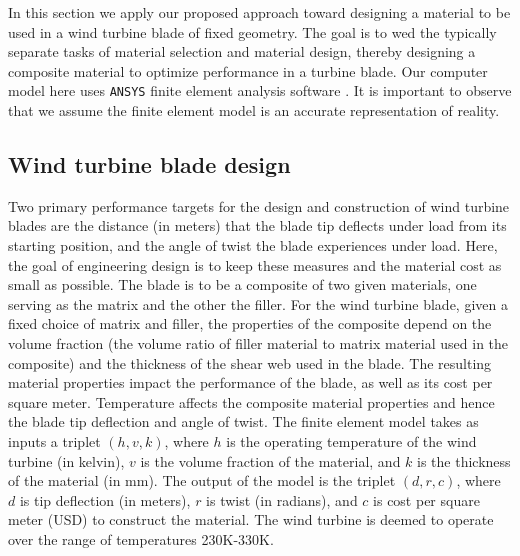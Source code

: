 \documentclass[12pt]{article}
\begin{document}
In this section we apply our proposed approach toward designing a material to be used in a wind turbine blade of fixed geometry. 
%
The goal is to wed the typically separate tasks of material selection and material design, thereby designing a composite material to optimize performance in a turbine blade.
%
Our computer model here uses \texttt{ANSYS} finite element analysis software \citep{ansys}. 
It is important to observe that we assume the finite element model is an accurate representation of reality.

\subsection{Wind turbine blade design}

Two primary performance targets for the design and construction of wind turbine blades are the distance (in meters) that the blade tip deflects under load from its starting position, and the angle of twist the blade experiences under load.
%
Here, the goal of engineering design is to keep these measures and the material cost as small as possible.
%
The blade is to be a composite of two given materials, one serving as the matrix and the other the filler. 
%
For the wind turbine blade, given a fixed choice of matrix and filler, the properties of the composite depend on the volume fraction (the volume ratio of filler material to matrix material used in the composite) and the thickness of the shear web used in the blade. 
%
The resulting material properties impact the performance of the blade, as well as its cost per square meter. 
%
Temperature affects the composite material properties and hence the blade tip deflection and angle of twist.
%
The finite element model takes as inputs a triplet $(h,v,k)$, where $h$ is the operating temperature of the wind turbine (in kelvin), $v$ is the volume fraction of the material, and $k$ is the thickness of the material (in mm). 
%
The output of the model is the triplet $(d,r,c)$, where $d$ is tip deflection (in meters), $r$ is twist (in radians), and $c$ is cost per square meter (USD) to construct the material.
%
The wind turbine is deemed to operate over the range of temperatures 230K-330K. 
%
\end{document}

